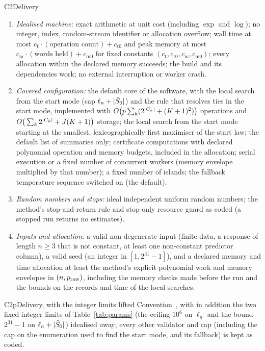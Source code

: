 \begin{convention}{C2}{Delivery}
\begin{enumerate}[label=(\roman*),leftmargin=2em]
  \item \emph{Idealised machine:} exact arithmetic at unit cost (including $\exp$ and $\log$); no integer, index,
    random-stream identifier or allocation overflow; wall time at most $c_{\mathrm t}\cdot(\text{operation count})+c_{\mathrm
    t0}$ and peak memory at most $c_{\mathrm m}\cdot(\text{words held})+c_{\mathrm m0}$ for fixed constants $(c_{\mathrm
    t},c_{\mathrm t0},c_{\mathrm m},c_{\mathrm m0})$; every allocation within the declared memory succeeds; the build and its
    dependencies work; no external interruption or worker crash.
  \item \emph{Covered configuration:} the default core of the software, with the local search from the start mode (cap
    $\ell_n+\lvert \tilde S_0\rvert$) and the rule that resolves ties in the start mode, implemented with
    $O\big(p\sum_k(2^{\lvert C_k\rvert}+(K+1)^2)\big)$ operations and $O\big(\sum_k2^{\lvert C_k\rvert}+J(K+1)\big)$ storage; the local
    search from the start mode starting at the smallest, lexicographically first maximiser of the start law; the default
    list of summaries only; certificate computations with declared polynomial operation and memory budgets, included in
    the allocation; serial execution or a fixed number of concurrent workers (memory envelope multiplied by that number);
    a fixed number of islands; the fallback temperature sequence switched on (the default).
  \item \emph{Random numbers and stops:} ideal independent uniform random numbers; the method's stop-and-return rule and
    stop-only resource guard as coded (a stopped run returns no estimates).
  \item \emph{Inputs and allocation:} a valid non-degenerate input (finite data, a response of length $n\ge3$ that is not
    constant, at least one non-constant predictor column), a valid seed (an integer in $[1,2^{31}-1]$), and a declared memory and time
    allocation at least the method's explicit polynomial work and memory envelopes in $(n,p_{\mathrm{raw}})$, including the memory
    checks made before the run and the bounds on the records and time of the local searches.
\end{enumerate}
\end{convention}

\begin{convention}{C2p}{Delivery, with the integer limits lifted}
Convention~, with in addition the two fixed integer limits of Table~\ref{tab:params} (the ceiling $10^6$ on $\ell_n$
and the bound $2^{31}-1$ on $\ell_n+\lvert \tilde S_0\rvert$) idealised away; every other validator and cap (including the cap on the
enumeration used to find the start mode, and its fallback) is kept as coded.
\end{convention}

